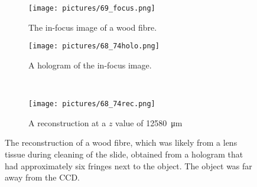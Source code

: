 \begin{figure}[ht!]
    \begin{center}

        \begin{subfigure}[t]{0.4\textwidth}
            \label{fig:69_focus}
            \texttt{[image: pictures/69\_focus.png]}
            \caption{The in-focus image of a wood fibre.}
        \end{subfigure}
                \hspace*{\fill}
        \begin{subfigure}[t]{0.4\textwidth}
            \label{fig:68_74holo}
            \texttt{[image: pictures/68\_74holo.png]}
            \caption{A hologram of the in-focus image.}
        \end{subfigure}
        \\
        \begin{subfigure}[t]{\textwidth}
            \label{fig:68_74rec}
            \texttt{[image: pictures/68\_74rec.png]}
            \caption{A reconstruction at a $z$ value of \SI{12580}{\micro\meter}}
        \end{subfigure}


    \end{center}
    \caption{%
        The reconstruction of a wood fibre, which was likely from a lens tissue
        during cleaning of the slide, obtained from a hologram that had
        approximately six fringes next to the object. The object was far away from
        the CCD.
    }%
    \label{fig:68_74}
\end{figure}



%
%
%


